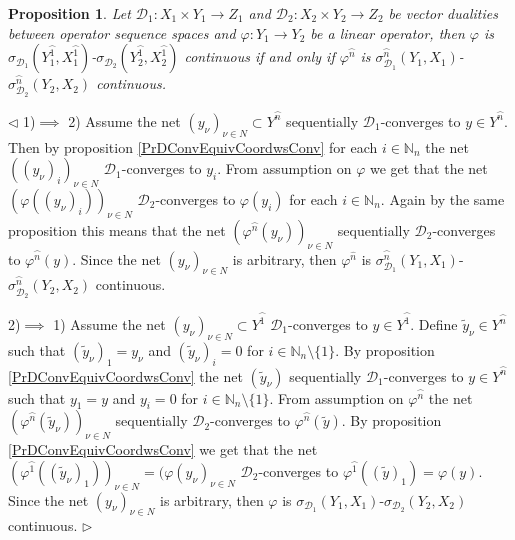 \documentclass[12pt]{article}
\newtheorem{proposition}[theorem]{Proposition}
\newenvironment{proof}{\par $\triangleleft$}{$\triangleright$}
\begin{document}
\begin{proposition}\label{PrDContEquivCoordwsCont}
Let $\mathcal{D}_1:X_1\times Y_1\to Z_1$ and $\mathcal{D}_2:X_2\times Y_2\to Z_2$ be vector dualities between operator sequence spaces and $\varphi:Y_1\to Y_2$ be a linear operator, then $\varphi$ is $\sigma_{\mathcal{D}_1}(Y_1^{\wideparen{1}},X_1^{\wideparen{1}})$-$\sigma_{\mathcal{D}_2}(Y_2^{\wideparen{1}},X_2^{\wideparen{1}})$ continuous if and only if $\varphi^{\wideparen{n}}$ is $\sigma_{\mathcal{D}_1}^{\wideparen{n}}(Y_1,X_1)$-$\sigma_{\mathcal{D}_2}^{\wideparen{n}}(Y_2,X_2)$ continuous.
\end{proposition}
\begin{proof}
1)$\implies$ 2) Assume the net $(y_\nu)_{\nu\in N}\subset Y^{\wideparen{n}}$ sequentially $\mathcal{D}_1$-converges to $y\in Y^{\wideparen{n}}$. Then by proposition \ref{PrDConvEquivCoordwsConv} for each $i\in\mathbb{N}_n$ the net $((y_\nu)_i)_{\nu\in N}$ $\mathcal{D}_1$-converges to $y_i$. From assumption on $\varphi$ we get that the net $(\varphi((y_\nu)_i))_{\nu\in N}$ $\mathcal{D}_2$-converges to $\varphi(y_i)$ for each $i\in\mathbb{N}_n$. Again by the same proposition this means that the net $(\varphi^{\wideparen{n}}(y_\nu))_{\nu\in N}$ sequentially $\mathcal{D}_2$-converges to $\varphi^{\wideparen{n}}(y)$. Since the net $(y_\nu)_{\nu\in N}$ is arbitrary, then $\varphi^{\widehat{n}}$ is $\sigma_{\mathcal{D}_1}^{\wideparen{n}}(Y_1,X_1)$-$\sigma_{\mathcal{D}_2}^{\wideparen{n}}(Y_2,X_2)$ continuous.

2)$\implies$ 1) Assume the net $(y_\nu)_{\nu\in N}\subset Y^{\wideparen{1}}$ $\mathcal{D}_1$-converges to $y\in Y^{\wideparen{1}}$. Define $\widetilde{y}_\nu\in Y^{\wideparen{n}}$ such that $(\widetilde{y}_\nu)_1=y_\nu$ and $(\widetilde{y}_\nu)_i=0$ for $i\in\mathbb{N}_n\setminus\{1\}$. By proposition \ref{PrDConvEquivCoordwsConv} the net $(\widetilde{y}_\nu)$ sequentially $\mathcal{D}_1$-converges to $y\in Y^{\wideparen{n}}$ such that $y_1=y$ and $y_i=0$ for $i\in\mathbb{N}_n\setminus\{1\}$. From assumption on $\varphi^{\wideparen{n}}$ the net $(\varphi^{\wideparen{n}}(\widetilde{y}_\nu))_{\nu\in N}$ sequentially  $\mathcal{D}_2$-converges to $\varphi^{\wideparen{n}}(\widetilde{y})$. By proposition \ref{PrDConvEquivCoordwsConv} we get that the net $(\varphi^{\wideparen{1}}((\widetilde{y}_\nu)_1))_{\nu\in N}=(\varphi(y_\nu)_{\nu\in N}$ $\mathcal{D}_2$-converges to $\varphi^{\wideparen{1}}((\widetilde{y})_1)=\varphi(y)$. Since the net $(y_\nu)_{\nu\in N}$ is arbitrary, then $\varphi$ is $\sigma_{\mathcal{D}_1}(Y_1,X_1)$-$\sigma_{\mathcal{D}_2}(Y_2,X_2)$ continuous.
\end{proof}
\end{document}
